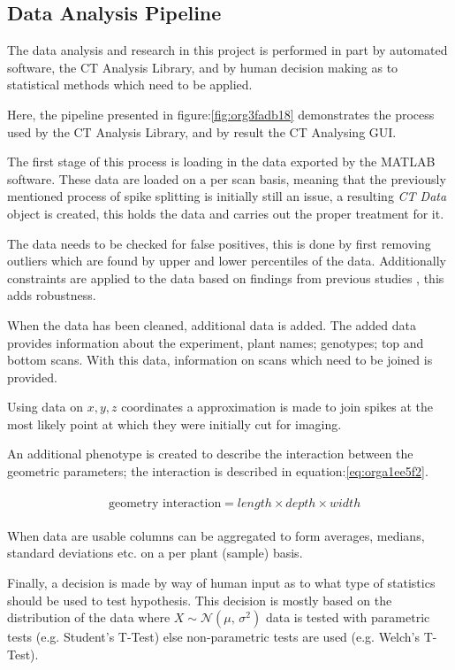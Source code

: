 \documentclass[11pt]{report}
\begin{document}
\subsection{Data Analysis Pipeline}
\label{sec:orgbfebe23}
The data analysis and research in this project is performed in part by automated software, the CT Analysis Library, and by human decision making as to statistical methods which need to be applied.

Here, the pipeline presented in figure:\ref{fig:org3fadb18} demonstrates the process used by the CT Analysis Library, and by result the CT Analysing GUI.

The first stage of this process is loading in the data exported by the MATLAB software. These data are loaded on a per scan basis, meaning that the previously mentioned process of spike splitting is initially still an issue, a resulting \emph{CT Data} object is created, this holds the data and carries out the proper treatment for it.

The data needs to be checked for false positives, this is done by first removing outliers which are found by upper and lower percentiles of the data. Additionally constraints are applied to the data based on findings from previous studies \cite{Hughes2017}, this adds robustness.

When the data has been cleaned, additional data is added. The added data provides information about the experiment, plant names; genotypes; top and bottom scans. With this data, information on scans which need to be joined is provided.

Using data on \(x,y,z\) coordinates a approximation is made to join spikes at the most likely point at which they were initially cut for imaging.

An additional phenotype is created to describe the interaction between the geometric parameters; the interaction is described in equation:\ref{eq:orga1ee5f2}.

 \begin{align}
\label{eq:orga1ee5f2}
   &\begin{aligned}
\text{geometry interaction} = length \times depth \times width
   \end{aligned}
 \end{align}

When data are usable columns can be aggregated to form averages, medians, standard deviations etc. on a per plant (sample) basis.

Finally, a decision is made by way of human input as to what type of statistics should be used to test hypothesis. This decision is mostly based on the distribution of the data where \(X \sim \mathcal{N}(\mu,\,\sigma^{2})\) data is tested with parametric tests (e.g. Student's T-Test) else non-parametric tests are used (e.g. Welch's T-Test).
\end{document}

